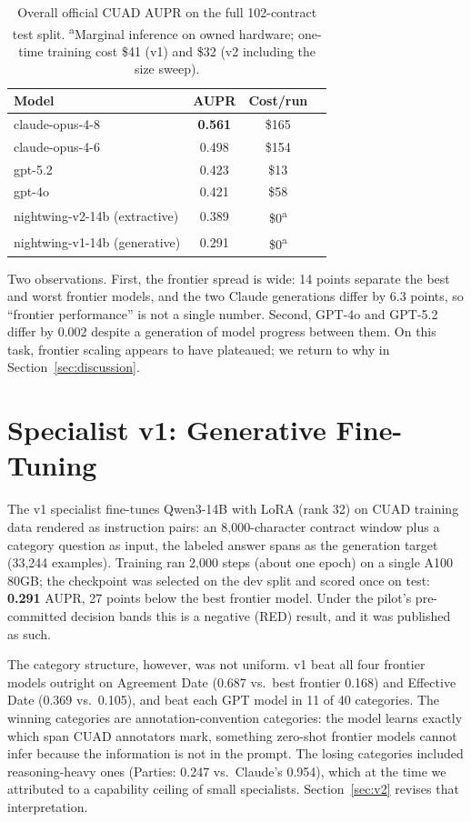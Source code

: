 \documentclass[11pt,letterpaper]{article}
\begin{document}
\begin{table}[t]
\centering
\small
\begin{tabular}{lccc}
\toprule
Model & AUPR & Cost/run \\
\midrule
claude-opus-4-8 & \textbf{0.561} & \$165 \\
claude-opus-4-6 & 0.498 & \$154 \\
gpt-5.2 & 0.423 & \$13 \\
gpt-4o & 0.421 & \$58 \\
\midrule
nightwing-v2-14b (extractive) & 0.389 & \$0\textsuperscript{a} \\
nightwing-v1-14b (generative) & 0.291 & \$0\textsuperscript{a} \\
\bottomrule
\end{tabular}
\caption{Overall official CUAD AUPR on the full 102-contract test split.
\textsuperscript{a}Marginal inference on owned hardware; one-time training
cost \$41 (v1) and \$32 (v2 including the size sweep).}
\label{tab:overall}
\end{table}

Two observations. First, the frontier spread is wide: 14 points separate the
best and worst frontier models, and the two Claude generations differ by 6.3
points, so ``frontier performance'' is not a single number. Second, GPT-4o
and GPT-5.2 differ by 0.002 despite a generation of model progress between
them. On this task, frontier scaling appears to have plateaued; we return to
why in Section~\ref{sec:discussion}.

\section{Specialist v1: Generative Fine-Tuning}
\label{sec:v1}

The v1 specialist fine-tunes Qwen3-14B with LoRA (rank 32) on CUAD training
data rendered as instruction pairs: an 8{,}000-character contract window plus
a category question as input, the labeled answer spans as the generation
target (33{,}244 examples). Training ran 2{,}000 steps (about one epoch) on a
single A100 80GB; the checkpoint was selected on the dev split and scored
once on test: \textbf{0.291} AUPR, 27 points below the best frontier model.
Under the pilot's pre-committed decision bands this is a negative (RED)
result, and it was published as such.

The category structure, however, was not uniform. v1 beat all four frontier
models outright on Agreement Date (0.687 vs.\ best frontier 0.168) and
Effective Date (0.369 vs.\ 0.105), and beat each GPT model in 11 of 40
categories. The winning categories are annotation-convention categories:
the model learns exactly which span CUAD annotators mark, something zero-shot
frontier models cannot infer because the information is not in the prompt.
The losing categories included reasoning-heavy ones (Parties: 0.247 vs.\
Claude's 0.954), which at the time we attributed to a capability ceiling of
small specialists. Section~\ref{sec:v2} revises that interpretation.
\end{document}
